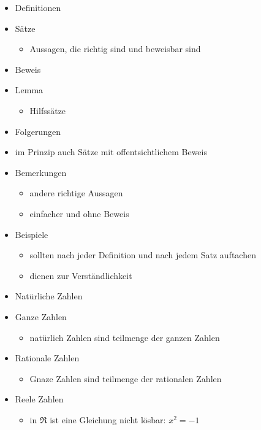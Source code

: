 \documentclass{../tudscript}
\begin{document}
\hypertarget{begriffe}{%
\label{begriffe}}

\begin{itemize}
\tightlist
\item
  Definitionen
\item
  Sätze

  \begin{itemize}
  \tightlist
  \item
    Aussagen, die richtig sind und beweisbar sind
  \end{itemize}
\item
  Beweis
\item
  Lemma

  \begin{itemize}
  \tightlist
  \item
    Hilfssätze
  \end{itemize}
\item
  Folgerungen
\item
  im Prinzip auch Sätze mit offentsichtlichem Beweis
\item
  Bemerkungen

  \begin{itemize}
  \tightlist
  \item
    andere richtige Aussagen
  \item
    einfacher und ohne Beweis
  \end{itemize}
\item
  Beispiele

  \begin{itemize}
  \tightlist
  \item
    sollten nach jeder Definition und nach jedem Satz auftachen
  \item
    dienen zur Verständlichkeit
  \end{itemize}
\end{itemize}

\hypertarget{zahlenbereiche}{%
\label{zahlenbereiche}}

\begin{itemize}
\tightlist
\item
  Natürliche Zahlen
\item
  Ganze Zahlen

  \begin{itemize}
  \tightlist
  \item
    natürlich Zahlen sind teilmenge der ganzen Zahlen
  \end{itemize}
\item
  Rationale Zahlen

  \begin{itemize}
  \tightlist
  \item
    Gnaze Zahlen sind teilmenge der rationalen Zahlen
  \end{itemize}
\item
  Reele Zahlen

  \begin{itemize}
  \tightlist
  \item
    in \(\Re\) ist eine Gleichung nicht lösbar: \(x^{2} = -1\)
  \end{itemize}
\end{itemize}
\end{document}
